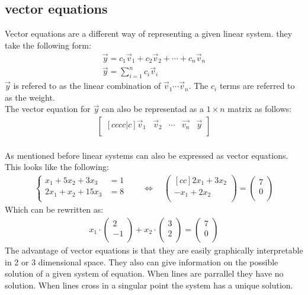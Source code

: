 \documentclass[11pt, a4paper]{article}
\begin{document}
\subsection{vector equations}
Vector equations are a different way of representing a given linear system. they take the following form:
\begin{gather*}
    \vec{y} = c_1\vec{v}_1 + c_2\vec{v}_2 + \cdots + c_n\vec{v}_n\\
    \vec{y} = \sum_{i=1}^{n} c_i\vec{v}_i
\end{gather*}
$\vec{y}$ is refered to as the linear combination of $\vec{v}_1 \cdots \vec{v}_n$. The $c_i$ terms are referred
to as the weight.\\
The vector equation for $\vec{y}$ can also be representad as a $1\times n$ matrix as follows:
\begin{align*}
    \begin{bmatrix}[cccc|c]
        \vec{v}_1 & \vec{v}_2 & \cdots & \vec{v_n} & \vec{y}\\
    \end{bmatrix}
\end{align*}
\\
As mentioned before linear systems can also be expressed as vector equations.
This looks like the following:
\begin{align*}
    \begin{cases} 
        x_1 + 5x_2 + 3x_3 &= 1 \\
        2x_1 + x_2 + 15x_3 &= 8 \\
        \end{cases}
    \quad &\Leftrightarrow \quad
    \begin{pmatrix}[cc]
        2x_1 + 3x_2 \\
        -x_1 + 2x_2 \\
    \end{pmatrix}
        =
    \begin{pmatrix}
        7\\
        0\\
    \end{pmatrix}
\end{align*}
Which can be rewritten as:
\begin{align*}
    x_1 \cdot
    \begin{pmatrix}
        2\\
        -1\\
    \end{pmatrix}
    + x_2 \cdot
    \begin{pmatrix}
        3\\
        2\\
    \end{pmatrix}
    =
    \begin{pmatrix}
        7\\
        0\\
    \end{pmatrix}
\end{align*}
The advantage of vector equations is that they are easily graphically interpretable in 2 or 3 dimensional space.
They also can give information on the possible solution of a given system of equation. When lines
are parrallel they have no solution. When lines cross in a singular point the system has a unique solution.
\end{document}
